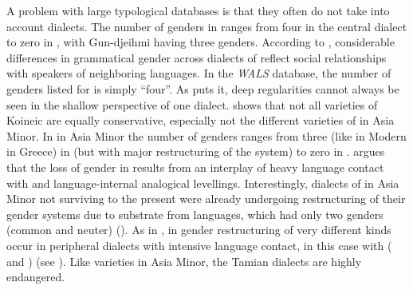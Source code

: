 \documentclass[output=collectionpaper]{langsci/langscibook}
\begin{document}
A problem with large typological databases is that they often do not take into account dialects. The number of genders in  ranges from four in the central  dialect to zero in , with Gun-djeihmi having three genders. According to \cite{Evans1997}, considerable differences in grammatical gender across dialects of  reflect social relationships with speakers of neighboring languages. In the \textit{WALS} database, the number of genders listed for  is simply ``four''. As \cite[105]{Evans1997} puts it, deep regularities cannot always be seen in the shallow perspective of one dialect. \cite{Karatsareas2014} shows that not all varieties of Koineic  are equally conservative, especially not the different varieties of  in Asia Minor. In  in Asia Minor the number of genders ranges from three (like in Modern  in Greece) in   (but with major restructuring of the system) to zero in  . \cite{Karatsareas2009} argues that the loss of gender in   results from an interplay of heavy language contact with  and language-internal analogical levellings. Interestingly, dialects of  in Asia Minor not surviving to the present were already undergoing restructuring of their gender systems due to substrate from  languages, which had only two genders (common and neuter) (\citealt[176]{Brixhe1994}). As in , in  gender restructuring of very different kinds occur in peripheral dialects with intensive language contact, in this case with  ( and ) (see \citealt{Waelchli2017}). Like  varieties in Asia Minor, the Tamian  dialects are highly endangered.
\end{document}
